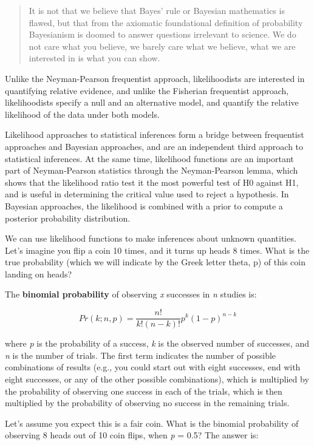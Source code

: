 \documentclass[
]{krantz}
\begin{document}
\begin{quote}
It is not that we believe that Bayes' rule or Bayesian mathematics is flawed, but that from the axiomatic foundational definition of probability Bayesianism is doomed to answer questions irrelevant to science. We do not care what you believe, we barely care what we believe, what we are interested in is what you can show.
\end{quote}

Unlike the Neyman-Pearson frequentist approach, likelihoodists are interested in quantifying relative evidence, and unlike the Fisherian frequentist approach, likelihoodists specify a null and an alternative model, and quantify the relative likelihood of the data under both models.

Likelihood approaches to statistical inferences form a bridge between frequentist approaches and Bayesian approaches, and are an independent third approach to statistical inferences. At the same time, likelihood functions are an important part of Neyman-Pearson statistics through the Neyman-Pearson lemma, which shows that the likelihood ratio test it the most powerful test of H0 against H1, and is useful in determining the critical value used to reject a hypothesis. In Bayesian approaches, the likelihood is combined with a prior to compute a posterior probability distribution.

We can use likelihood functions to make inferences about unknown quantities. Let's imagine you flip a coin 10 times, and it turns up heads 8 times. What is the true probability (which we will indicate by the Greek letter theta, p) of this coin landing on heads?

The \textbf{binomial probability} of observing \emph{x} successes in \emph{n} studies is:

\[
Pr\left( k;n, p \right) = \frac{n!}{k!\left( n - k \right)!}p^{k}{(1 - p)}^{n - k}
\]

where \emph{p} is the probability of a success, \emph{k} is the observed number of successes, and \emph{n} is the number of trials. The first term indicates the number of possible combinations of results (e.g., you could start out with eight successes, end with eight successes, or any of the other possible combinations), which is multiplied by the probability of observing one success in each of the trials, which is then multiplied by the probability of observing no success in the remaining trials.

Let's assume you expect this is a fair coin. What is the binomial probability of observing 8 heads out of 10 coin flips, when \emph{p} = 0.5? The answer is:
\end{document}
